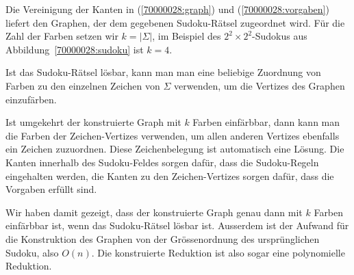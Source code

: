 \begin{loesung}
Die Vereinigung der Kanten in (\ref{70000028:graph}) und
(\ref{70000028:vorgaben}) liefert den Graphen, der dem gegebenen
Sudoku-Rätsel zugeordnet wird.
Für die Zahl der Farben setzen wir $k=|\Sigma|$, im Beispiel des
$2^2\times 2^2$-Sudokus aus Abbildung~\ref{70000028:sudoku} ist $k=4$.

Ist das Sudoku-Rätsel lösbar, kann man man eine beliebige
Zuordnung von Farben zu den einzelnen Zeichen von $\Sigma$ verwenden,
um die Vertizes des Graphen einzufärben. 

Ist umgekehrt der konstruierte Graph mit $k$ Farben einfärbbar, dann kann man
die Farben der Zeichen-Vertizes verwenden, um allen anderen Vertizes
ebenfalls ein Zeichen zuzuordnen. Diese Zeichenbelegung ist automatisch
eine Lösung. Die Kanten innerhalb des Sudoku-Feldes sorgen dafür, dass
die Sudoku-Regeln eingehalten werden, die Kanten zu den Zeichen-Vertizes
sorgen dafür, dass die Vorgaben erfüllt sind.

Wir haben damit gezeigt, dass der konstruierte Graph genau dann mit
$k$ Farben einfärbbar ist, wenn das Sudoku-Rätsel lösbar ist. 
Ausserdem ist der Aufwand für die Konstruktion des Graphen von der
Grössenordnung des ursprünglichen Sudoku, also $O(n)$. Die konstruierte
Reduktion ist also sogar eine polynomielle Reduktion.
\end{loesung}


